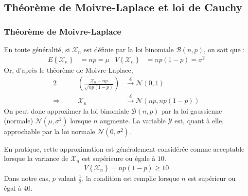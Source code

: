 \documentclass[a4paper, 12pt]{article}
\begin{document}
		\subsection{Théorème de Moivre-Laplace et loi de Cauchy}
		\subsubsection*{Théorème de Moivre-Laplace}
		En toute généralité, si $\mathcal{X}_n$ est définie par la loi binomiale $\mathcal{B}\left(n,p\right)$, on sait que :
		\begin{align*}
		E\left\{\mathcal{X}_n\right\} & = np = \mu & V\left\{\mathcal{X}_n\right\} & = n p \left(1 - p\right) = \sigma^2
		\end{align*}
		Or, d'après le théorème de Moivre-Laplace,
		\begin{alignat*}{2}
		&& \left(\frac{\mathcal{X}_n - np}{\sqrt{n p \left(1 - p\right)}}\right) & \xrightarrow{\mathcal{L}} \mathcal{N}(0,1) \\
		\Rightarrow \quad && \mathcal{X}_n & \xrightarrow{\mathcal{L}} \mathcal{N}\left(np,n p \left(1 - p\right)\right)
		\end{alignat*}
		On peut donc approximer la loi binomiale $\mathcal{B}\left(n,p\right)$ par la loi gaussienne (normale) $\mathcal{N}\left(\mu,\sigma^2\right)$ lorsque $n$ augmente. La variable $\mathcal{Y}$ est, quant à elle, approchable par la loi normale $\mathcal{N}\left(0,\sigma^2\right)$. \par
		En pratique, cette approximation est généralement considérée comme acceptable lorsque la variance de $\mathcal{X}_n$ est supérieure ou égale à $10$.
		\begin{align*}
			V\left\{\mathcal{X}_n\right\} = n p \left(1 - p\right) \geq 10
		\end{align*}
		Dans notre cas, $p$ valant $\frac{1}{2}$, la condition est remplie lorsque $n$ est supérieur ou égal à $40$.
\end{document}
